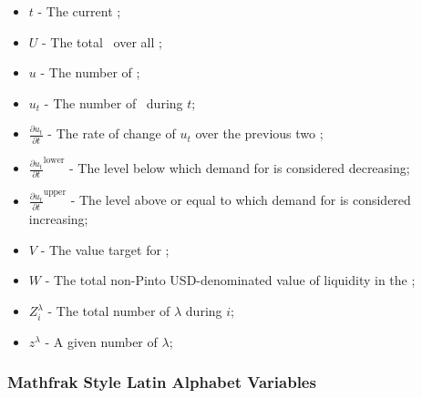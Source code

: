 \documentclass[class=article, crop=false]{standalone}
\begin{document}
\begin{itemize}[topsep=0pt, itemsep=3pt,leftmargin=16pt]
    \item[] $t$ - The current ;
    \item[] $U$ - The total  \Pinto\ over all ;
    \item[] $u$ - The number of  \Pinto;
    \item[] $u_{t}$ - The number of  \Pinto\ during $t$;
    \item[] $\frac{\partial u_{t}}{\partial t}$ - The rate of change of $u_{t}$ over the previous two ;
    \item[] $\frac{\partial u_{t}}{\partial t}^{\text{lower}}$ - The level below which demand for  is considered decreasing;
    \item[] $\frac{\partial u_{t}}{\partial t}^{\text{upper}}$ - The level above or equal to which demand for  is considered increasing;
    \item[] $V$ - The value target for ;
    \item[] $W$ - The total non-Pinto USD-denominated value of liquidity in the ;
    \item[] $Z_{i}^{\lambda}$ - The total number of $\lambda$  during  $i$;
    \item[] $z^{\lambda}$ - A given number of  $\lambda$;
\end{itemize}


\subsubsection{Mathfrak Style Latin Alphabet Variables}
\end{document}
